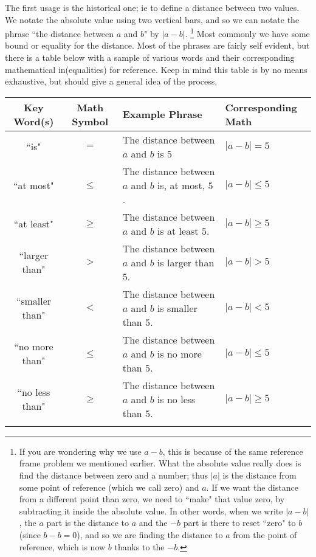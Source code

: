 \documentclass{ximeraXloud}
\begin{document}
    The first usage is the historical one; ie to define a distance between two values. We notate the absolute value using two vertical bars, and so we can notate the phrase ``the distance between $a$ and $b$" by $|a-b|$.%
    \footnote{If you are wondering why we use $a - b$, this is because of the same reference frame problem we mentioned earlier. What the absolute value really does is find the distance between zero and a number; thus $|a|$ is the distance from some point of reference (which we call zero) and $a$. If we want the distance from a different point than zero, we need to ``make" that value zero, by subtracting it inside the absolute value. In other words, when we write $|a - b|$, the $a$ part is the distance to $a$ and the $ - b$ part is there to reset ``zero" to $b$ (since $b - b = 0$), and so we are finding the distance to $a$ from the point of reference, which is now $b$ thanks to the $-b$.}
    Most commonly we have some bound or equality for the distance. Most of the phrases are fairly self evident, but there is a table below with a sample of various words and their corresponding mathematical in(equalities) for reference. Keep in mind this table is by no means exhaustive, but should give a general idea of the process.
    
    \begin{tabularx}{\textwidth}{|ccXX|}\hline
        Key Word(s)         &   Math Symbol &   Example Phrase                                      & Corresponding Math\\ \hline
        
        ``is"               &   $=$         &   The distance between $a$ and $b$ is $5$             & $|a-b| = 5$\\\hdashline
        ``at most"          &   $\leq$      &   The distance between $a$ and $b$ is, at most, $5$.  & $|a-b| \leq 5$\\\hdashline
        ``at least"         &   $\geq$      &   The distance between $a$ and $b$ is at least $5$.   & $|a-b| \geq 5$\\\hdashline
        ``larger than"   &   $>$            &   The distance between $a$ and $b$ is larger than $5$.& $|a-b| > 5$\\\hdashline
        ``smaller than"  &   $<$            &   The distance between $a$ and $b$ is smaller than $5$.& $|a-b| < 5$\\ 
        ``no more than"  &   $\leq$         &   The distance between $a$ and $b$ is no more than $5$.& $|a-b| \leq 5$\\\hdashline
        ``no less than"  &   $\geq$         &   The distance between $a$ and $b$ is no less than $5$.& $|a-b| \geq 5$\\\hdashline
        \hline
    \end{tabularx}
\end{document}
